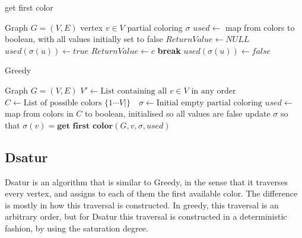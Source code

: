 \documentclass[a4paper]{article}
\newcommand{\algorithmicbreak}{\textbf{break}}
\newcommand{\BREAK}{\STATE \algorithmicbreak}
\begin{document}
\begin{algorithm}[H]
  \caption{get first color}
  \label{alg:greedy}
  \begin{algorithmic}[1]
      \REQUIRE Graph $G = (V,E)$
      \REQUIRE vertex $v \in V$
      \REQUIRE partial coloring $\sigma$
      \REQUIRE $used \leftarrow $ map from colors to boolean, with all values
      initially set to false
        \STATE $ReturnValue \leftarrow NULL$
                \STATE $used(\sigma(u)) \leftarrow true$
            \ENDIF
        \ENDFOR
                \STATE $ReturnValue \leftarrow c$
                \BREAK
            \ENDIF
        \ENDFOR
                \STATE $used(\sigma(u)) \leftarrow false$
            \ENDIF
        \ENDFOR
  \end{algorithmic}
\end{algorithm}


\begin{algorithm}[H]
  \caption{Greedy}
  \label{alg:greedy}
  \begin{algorithmic}[1]
      \REQUIRE Graph $G = (V,E)$
      \STATE $V' \leftarrow \text{List containing all $v \in V$ in any order}$
      \STATE $C \leftarrow \text{List of possible colors $\{1 \cdots V| \}$ }$
      \STATE $\sigma \leftarrow \text{Initial empty partial coloring}$
      \STATE $used \leftarrow $ map from colors in $C$ to boolean, initialised
      so all values are false
        \STATE update $\sigma$ so that  $\sigma(v) = \textbf{get first color}(G,v,\sigma,used)$
    \ENDFOR
  \end{algorithmic}
\end{algorithm}

\subsection{Dsatur}

Dsatur is an algorithm that is similar to Greedy, in the sense that it
traverses every vertex, and assigns to each of them the first available color.
The difference is mostly in how this traversal is constructed. In greedy, this
traversal is an arbitrary order, but for Dsatur this traversal is constructed
in a deterministic fashion, by using the saturation degree.
\end{document}
